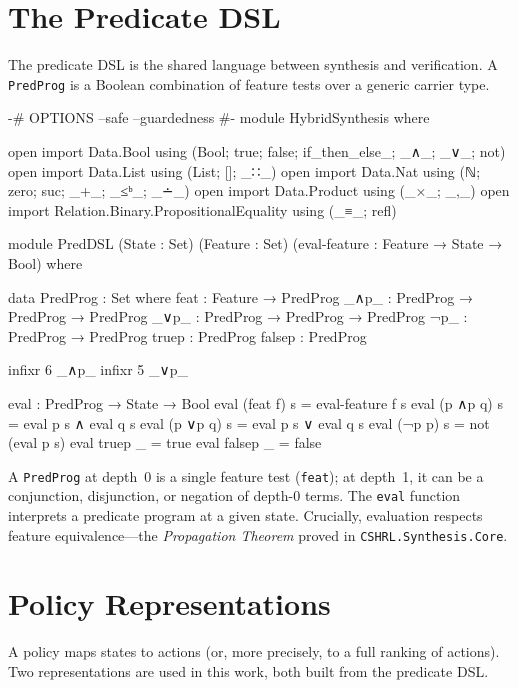 \documentclass[9pt,a4paper]{article}
\newcommand{\fpath}[1]{\nolinkurl{#1}}
\theoremstyle{plain}
\theoremstyle{definition}
\theoremstyle{remark}
\begin{document}
\section{The Predicate DSL}

The predicate DSL is the shared language between synthesis and
verification. A \texttt{PredProg} is a Boolean combination of
feature tests over a generic carrier type.

\begin{spec}
{-# OPTIONS --safe --guardedness #-}
module HybridSynthesis where

open import Data.Bool
  using (Bool; true; false; if_then_else_; _∧_; _∨_; not)
open import Data.List using (List; []; _∷_)
open import Data.Nat  using (ℕ; zero; suc; _+_; _≤ᵇ_; _∸_)
open import Data.Product using (_×_; _,_)
open import Relation.Binary.PropositionalEquality using (_≡_; refl)

module PredDSL
  (State   : Set)
  (Feature : Set)
  (eval-feature : Feature → State → Bool)
  where

  data PredProg : Set where
    feat   : Feature → PredProg
    _∧p_   : PredProg → PredProg → PredProg
    _∨p_   : PredProg → PredProg → PredProg
    ¬p_    : PredProg → PredProg
    truep  : PredProg
    falsep : PredProg

  infixr 6 _∧p_
  infixr 5 _∨p_

  eval : PredProg → State → Bool
  eval (feat f)  s = eval-feature f s
  eval (p ∧p q)  s = eval p s ∧ eval q s
  eval (p ∨p q)  s = eval p s ∨ eval q s
  eval (¬p p)    s = not (eval p s)
  eval truep     _ = true
  eval falsep    _ = false
\end{spec}

A \texttt{PredProg} at depth~0 is a single feature test
(\texttt{feat}); at depth~1, it can be a conjunction, disjunction,
or negation of depth-0 terms. The \texttt{eval} function interprets
a predicate program at a given state. Crucially, evaluation respects
feature equivalence---the \emph{Propagation Theorem} proved in
\fpath{CSHRL.Synthesis.Core}.

\section{Policy Representations}

A policy maps states to actions (or, more precisely, to a full
ranking of actions). Two representations are used in this work,
both built from the predicate DSL.
\end{document}

